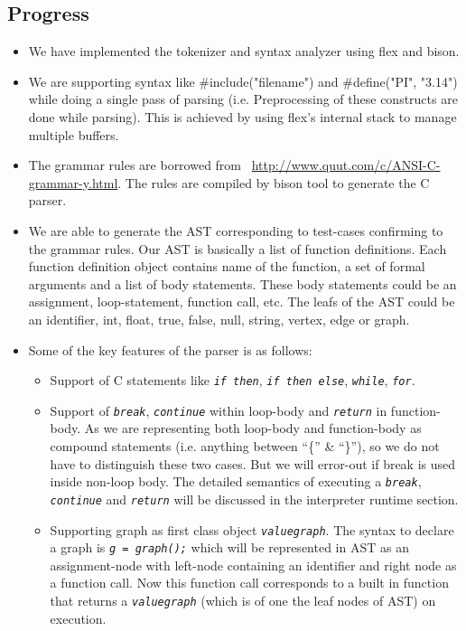 \documentclass[12,twoside]{article}
\begin{document}
  \subsection{Progress}
  \begin{itemize}
    \item We have implemented the tokenizer and syntax analyzer using flex and 
    bison.  \item We are supporting syntax like \#include("filename") and 
    \#define("PI", "3.14") while doing a single pass of parsing  (i.e.  
        Preprocessing of these constructs are done while parsing). This is 
    achieved by using flex's internal stack to manage multiple buffers.

    \item The grammar rules are borrowed from 
    ~\url{http://www.quut.com/c/ANSI-C-grammar-y.html}. The rules are compiled 
    by bison tool to generate the C parser. 

    \item  We are able to generate the AST corresponding to test-cases 
    confirming to the grammar rules. Our AST is basically a list of function 
    definitions. Each function definition object contains name of the function, 
    a set of formal arguments and a list of body statements. These body 
    statements could be an assignment, loop-statement, function call, etc.
    The leafs of the AST could be an identifier, int, float, true, false, null, 
    string, vertex, edge or graph.

    \item Some of the key features of the parser is as follows:
    \begin{itemize}
      \item Support of C statements like  {\tt\emph{if then}}, {\tt\emph{if then 
        else}}, {\tt\emph{while}}, {\tt\emph{for}}. 

      \item Support of {\tt\emph{break}}, {\tt\emph{continue}} within loop-body 
      and {\tt\emph{return}} in function-body.
      As we are representing both loop-body and function-body as compound 
      statements (i.e. anything between ``\{'' \& ``\}''), so we do not have to
      distinguish these two cases. But we will error-out if break is used inside 
      non-loop body. The detailed semantics of executing a {\tt\emph{break}},   
{\tt\emph{continue}} and {\tt\emph{return}} will be discussed in the interpreter 
runtime section.

      \item Supporting graph as first class object {\tt\emph{valuegraph}}.
      The syntax to declare a graph is {\tt\emph{g = graph();}} which will be 
      represented in AST as an assignment-node with left-node containing an 
      identifier and right
      node as a function call. Now this function call corresponds to a built in 
      function that returns a {\tt\emph{valuegraph}} (which is of one the leaf 
          nodes of AST) on execution.


\end{itemize}
\end{itemize}
\end{document}
